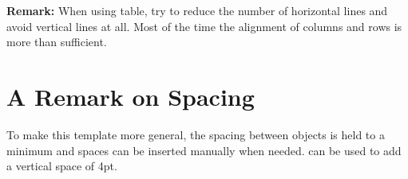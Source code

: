\documentclass[\fontheight]{extarticle}
\begin{document}
\begin{multicols*}{3}
    \textbf{Remark:} When using table, try to reduce the number of horizontal lines and avoid vertical lines at all.
    Most of the time the alignment of columns and rows is more than sufficient.

    \section{A Remark on Spacing}
    To make this template more general, the spacing between objects is held to a minimum and spaces can be inserted manually when needed.
     can be used to add a vertical space of 4pt.


\end{multicols*}
\end{document}
